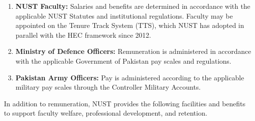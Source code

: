 \begin{enumerate}
    \renewcommand{\labelenumi}{(\alph{enumi})}
    \item \textbf{NUST Faculty:} Salaries and benefits are determined in
    accordance with the applicable NUST Statutes and institutional
    regulations. Faculty may be appointed on the Tenure Track System (TTS),
    which NUST has adopted in parallel with the HEC framework since 2012.

    \item \textbf{Ministry of Defence Officers:} Remuneration is administered
    in accordance with the applicable Government of Pakistan pay scales and
    regulations.

    \item \textbf{Pakistan Army Officers:} Pay is administered according to
    the applicable military pay scales through the Controller Military
    Accounts.
\end{enumerate}

In addition to remuneration, NUST provides the following facilities and
benefits to support faculty welfare, professional development, and retention.

